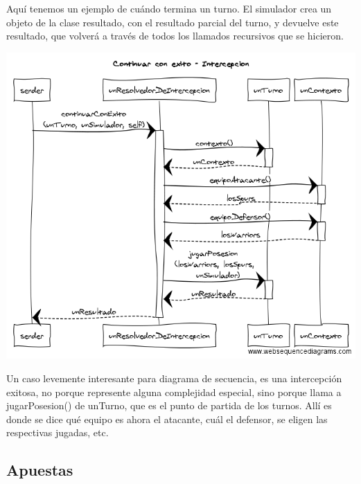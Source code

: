 Aquí tenemos un ejemplo de cuándo termina un turno. El simulador crea un objeto de la clase resultado, con el resultado parcial del turno, y devuelve este resultado, que volverá a través de todos los llamados recursivos que se hicieron.


\begin{center}
\includegraphics[scale=0.45]{diseno/Continuar_con_exito_intercepcion.png}
\end{center}

Un caso levemente interesante para diagrama de secuencia, es una intercepción exitosa, no porque represente alguna complejidad especial, sino porque llama a jugarPosesion() de unTurno, que es el punto de partida de los turnos. Allí es donde se dice qué equipo es ahora el atacante, cuál el defensor, se eligen las respectivas jugadas, etc.

\subsection{Apuestas}

